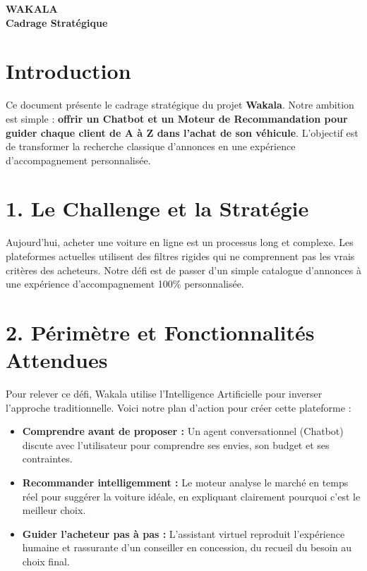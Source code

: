 \documentclass[a4paper, 11pt]{article}
\begin{document}
\begin{center}
    {\Huge \textcolor{primaryBlue}{\textbf{WAKALA}}}\\[0.2cm]
    {\large \bfseries \textcolor{primaryBlue}{Cadrage Stratégique}}
\end{center}

\vspace{0.5cm}

\section*{Introduction}
Ce document présente le cadrage stratégique du projet \textbf{Wakala}. Notre ambition est simple : \textbf{offrir un Chatbot et un Moteur de Recommandation pour guider chaque client de A à Z dans l'achat de son véhicule}. L'objectif est de transformer la recherche classique d'annonces en une expérience d'accompagnement personnalisée.

\vspace{0.3cm}

\section*{1. Le Challenge et la Stratégie}
Aujourd'hui, acheter une voiture en ligne est un processus long et complexe. Les plateformes actuelles utilisent des filtres rigides qui ne comprennent pas les vrais critères des acheteurs. Notre défi est de passer d'un simple catalogue d'annonces à une expérience d'accompagnement 100\% personnalisée.

\section*{2. Périmètre et Fonctionnalités Attendues}
Pour relever ce défi, Wakala utilise l'Intelligence Artificielle pour inverser l'approche traditionnelle. Voici notre plan d'action pour créer cette plateforme :
\begin{itemize}[label=\textbullet]
    \item \textbf{Comprendre avant de proposer :} Un agent conversationnel (Chatbot) discute avec l'utilisateur pour comprendre ses envies, son budget et ses contraintes.
    \item \textbf{Recommander intelligemment :} Le moteur analyse le marché en temps réel pour suggérer la voiture idéale, en expliquant clairement pourquoi c'est le meilleur choix.
    \item \textbf{Guider l'acheteur pas à pas :} L'assistant virtuel reproduit l'expérience humaine et rassurante d'un conseiller en concession, du recueil du besoin au choix final.
\end{itemize}
\end{document}
